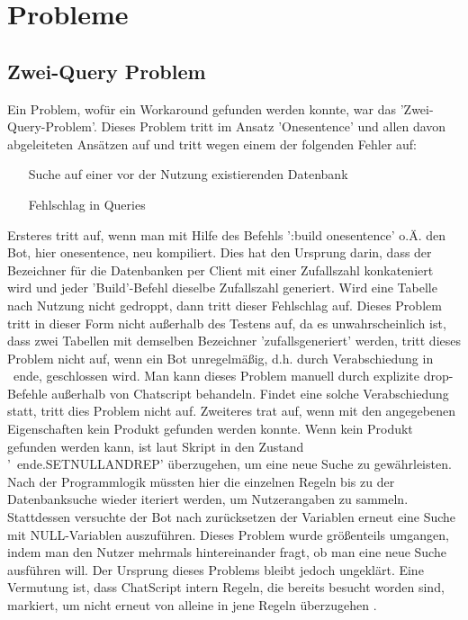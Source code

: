 \chapter{Probleme}
\label{sec:Probleme}


\section{Zwei-Query Problem}
\label{Section: Zwei-Query Problem}

Ein Problem, wofür ein Workaround gefunden werden konnte, war das 'Zwei-Query-Problem'. Dieses Problem tritt im Ansatz 'Onesentence' und allen davon abgeleiteten Ansätzen auf und tritt wegen einem der folgenden Fehler auf:

\begin{enumerate}
\item[Suche auf einer vor der Nutzung existierenden Datenbank]
\item[Fehlschlag in Queries]
\end{enumerate}  

Ersteres tritt auf, wenn man mit Hilfe des Befehls ':build onesentence' o.Ä. den Bot, hier onesentence, neu kompiliert. Dies hat den Ursprung darin, dass der Bezeichner für die Datenbanken per Client mit einer Zufallszahl konkateniert wird und jeder 'Build'-Befehl dieselbe Zufallszahl generiert. Wird eine Tabelle nach Nutzung nicht gedroppt, dann tritt dieser Fehlschlag auf. Dieses Problem tritt in dieser Form nicht außerhalb des Testens auf, da es unwahrscheinlich ist, dass zwei Tabellen mit demselben Bezeichner 'zufallsgeneriert' werden, tritt dieses Problem nicht auf, wenn ein Bot unregelmäßig, d.h. durch Verabschiedung in ~ende, geschlossen wird. Man kann dieses Problem manuell durch explizite drop-Befehle außerhalb von Chatscript behandeln. Findet eine solche Verabschiedung statt, tritt dies Problem nicht auf. 
Zweiteres trat auf, wenn mit den angegebenen Eigenschaften kein Produkt gefunden werden konnte. Wenn kein Produkt gefunden werden kann, ist laut Skript in den Zustand '~ende.SETNULLANDREP' überzugehen, um eine neue Suche zu gewährleisten. Nach der Programmlogik müssten hier die einzelnen Regeln bis zu der Datenbanksuche wieder iteriert werden, um Nutzerangaben zu sammeln. Stattdessen versuchte der Bot nach zurücksetzen der Variablen erneut eine Suche mit NULL-Variablen auszuführen. Dieses Problem wurde größenteils umgangen, indem man den Nutzer mehrmals hintereinander fragt, ob man eine neue Suche ausführen will. Der Ursprung dieses Problems bleibt jedoch ungeklärt. Eine Vermutung ist, dass ChatScript intern Regeln, die bereits besucht worden sind, markiert, um nicht erneut von alleine in jene Regeln überzugehen \cite{chatscript2019}.

